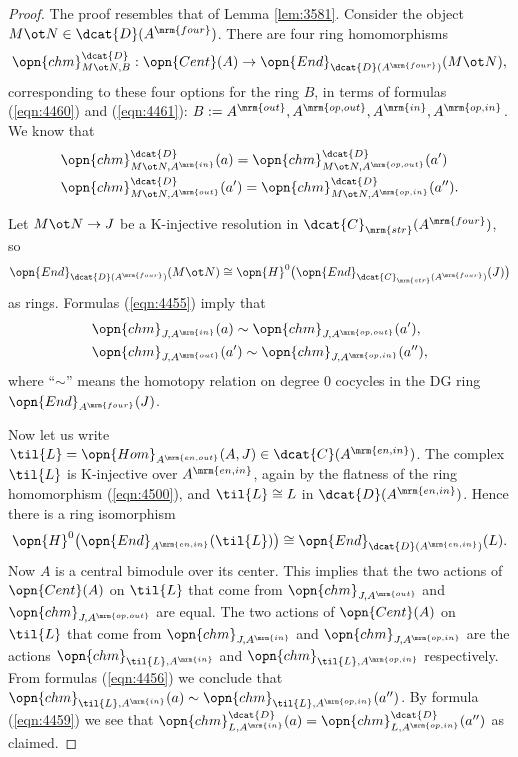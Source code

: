 \begin{proof}
The proof resembles that of Lemma \ref{lem:3581}.
Consider the object 
$M \ot N\in \dcat{D}(A^{\mrm{four}})$. 
There are four ring homomorphisms 
\[ \opn{chm}^{\dcat{D}}_{M \ot N, B} : \opn{Cent}(A) \to 
\opn{End}_{\dcat{D}(A^{\mrm{four}})}(M \ot N) , \]
corresponding to these four options for the ring $B$,
in terms of formulas (\ref{eqn:4460}) and (\ref{eqn:4461}):
$B := A^{\mrm{out}}, A^{\mrm{op, out}}, A^{\mrm{in}} , A^{\mrm{op, in}}$. 
We know that 
\begin{equation} \label{eqn:4455}
\begin{aligned}
& \opn{chm}^{\dcat{D}}_{M \ot N, A^{\mrm{in}}}(a) = 
\opn{chm}^{\dcat{D}}_{M \ot N, A^{\mrm{op, out}}}(a') 
\\ & 
\opn{chm}^{\dcat{D}}_{M \ot N, A^{\mrm{out}}}(a') = 
\opn{chm}^{\dcat{D}}_{M \ot N, A^{\mrm{op, in}}}(a'') . 
\end{aligned}
\end{equation}

Let $M \ot N \to J$ be a K-injective resolution in 
$\dcat{C}_{\mrm{str}}(A^{\mrm{four}})$, 
so 
\[ \opn{End}_{\dcat{D}(A^{\mrm{four}})}(M \ot N) \cong 
\opn{H}^0 \bigl( \opn{End}_{\dcat{C}_{\mrm{str}}(A^{\mrm{four}})}(J) \bigr) \]
as rings. Formulas (\ref{eqn:4455}) imply that 
\begin{equation} \label{eqn:4456}
\begin{aligned}
& \opn{chm}_{J, A^{\mrm{in}}}(a) \sim  
\opn{chm}_{J, A^{\mrm{op, out}}}(a') , 
\\ & 
\opn{chm}_{J, A^{\mrm{out}}}(a') \sim
\opn{chm}_{J, A^{\mrm{op, in}}}(a'') , 
\end{aligned}
\end{equation}
where ``$\sim$'' means the homotopy relation on degree $0$ cocycles in the 
DG ring $\opn{End}_{A^{\mrm{four}}}(J)$. 

Now let us write 
$\til{L} = \opn{Hom}_{A^{\mrm{en, out}}}(A, J) \in 
\dcat{C}(A^{\mrm{en, in}})$.
The complex $\til{L}$ is K-injective over $A^{\mrm{en, in}}$, 
again by the flatness of the ring homomorphism (\ref{eqn:4500}), 
and $\til{L} \cong L$ in $\dcat{D}(A^{\mrm{en, in}})$. 
Hence there is a ring isomorphism 
\begin{equation} \label{eqn:4459}
\opn{H}^0 \bigl( \opn{End}_{A^{\mrm{en, in}}}(\til{L}) \bigr) \cong
\opn{End}_{\dcat{D}(A^{\mrm{en, in}})}(L) . 
\end{equation}
Now $A$ is a central bimodule over its center.
This implies that the two actions of $\opn{Cent}(A)$ on $\til{L}$ that 
come from $\opn{chm}_{J, A^{\mrm{out}}}$ and 
$\opn{chm}_{J, A^{\mrm{op, out}}}$ are equal. 
The two actions of $\opn{Cent}(A)$ on $\til{L}$ that 
come from $\opn{chm}_{J, A^{\mrm{in}}}$ and 
$\opn{chm}_{J, A^{\mrm{op, in}}}$
are the actions  $\opn{chm}_{\til{L}, A^{\mrm{in}}}$ and 
$\opn{chm}_{\til{L}, A^{\mrm{op, in}}}$
respectively. From formulas (\ref{eqn:4456}) we conclude that 
$\opn{chm}_{\til{L}, A^{\mrm{in}}}(a) \sim
\opn{chm}_{\til{L}, A^{\mrm{op, in}}}(a'')$. 
By formula (\ref{eqn:4459}) we see that 
$\opn{chm}_{L, A^{\mrm{in}}}^{\dcat{D}}(a) = 
\opn{chm}^{\dcat{D}}_{L, A^{\mrm{op, in}}}(a'')$
as claimed. 
\end{proof}

